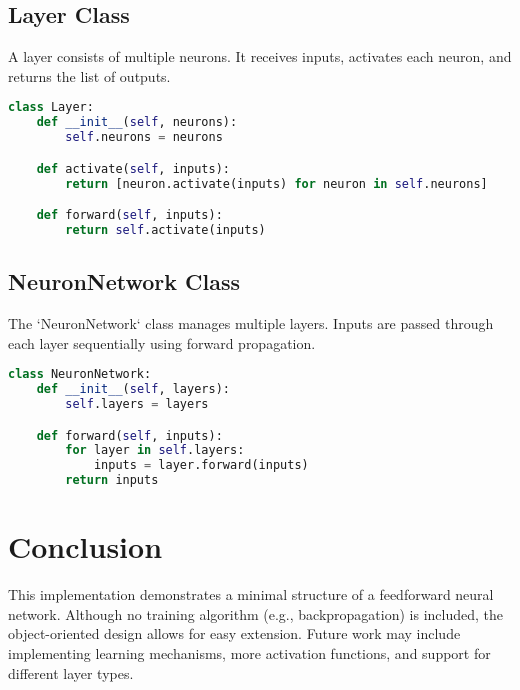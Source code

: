 \documentclass[a4paper, 12pt]{article}
\begin{document}
\subsection{Layer Class}
A layer consists of multiple neurons. It receives inputs, activates each neuron, and returns the list of outputs.

\begin{lstlisting}[language=Python, caption=Layer Definition]
class Layer:
    def __init__(self, neurons):
        self.neurons = neurons

    def activate(self, inputs):
        return [neuron.activate(inputs) for neuron in self.neurons]

    def forward(self, inputs):
        return self.activate(inputs)
\end{lstlisting}

\subsection{NeuronNetwork Class}
The `NeuronNetwork` class manages multiple layers. Inputs are passed through each layer sequentially using forward propagation.

\begin{lstlisting}[language=Python, caption=Network Definition]
class NeuronNetwork:
    def __init__(self, layers):
        self.layers = layers

    def forward(self, inputs):
        for layer in self.layers:
            inputs = layer.forward(inputs)
        return inputs
\end{lstlisting}

\section{Conclusion}
This implementation demonstrates a minimal structure of a feedforward neural network. Although no training algorithm (e.g., backpropagation) is included, the object-oriented design allows for easy extension. Future work may include implementing learning mechanisms, more activation functions, and support for different layer types.
\end{document}
